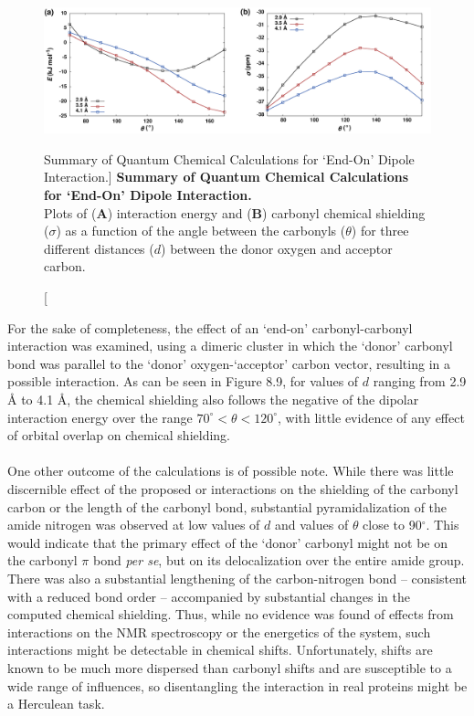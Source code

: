 \begin{figure}[h!]
\includegraphics[width=6.5in]{figs/npistar/09.png}
\caption
   [Summary of Quantum Chemical Calculations for `End-On' Dipole Interaction.]
  {{\bf
    Summary of Quantum Chemical Calculations for `End-On' Dipole Interaction.
  }
  \\
  Plots of ({\bf A}) interaction energy and ({\bf B}) carbonyl \cnmr{} chemical
  shielding ($\sigma$) as a function of the angle between the carbonyls
  ($\theta$) for three different distances ($d$) between the donor oxygen
  and acceptor carbon.
}
\end{figure}

\begin{doublespace}
For the sake of completeness, the effect of an `end-on' carbonyl-carbonyl
interaction was examined, using a dimeric cluster in which the `donor' carbonyl
bond was parallel to the `donor' oxygen-`acceptor' carbon vector, resulting in
a possible \nspistar{} interaction. As can be seen in Figure 8.9, for values of
$d$ ranging from 2.9 \r{A} to 4.1 \r{A}, the chemical shielding also follows
the negative of the dipolar interaction energy over the range
$70^\circ < \theta < 120^\circ$, with little evidence of any effect of orbital
overlap on chemical shielding.
\\\\
One other outcome of the calculations is of possible note. While there was
little discernible effect of the proposed \nspistar{} or \npipistar{}
interactions on the shielding of the carbonyl carbon or the length of the
carbonyl bond, substantial pyramidalization of the amide nitrogen was observed
at low values of $d$ and values of $\theta$ close to 90$^\circ$. This would
indicate that the primary effect of the `donor' carbonyl might not be on the
carbonyl $\pi$ bond \emph{per se}, but on its delocalization over the entire
amide group. There was also a substantial lengthening of the carbon-nitrogen
bond -- consistent with a reduced bond order -- accompanied by substantial
changes in the computed \nnmr{} chemical shielding. Thus, while no evidence
was found of effects from \nspistar{} interactions on the \cnmr{} NMR
spectroscopy or the energetics of the system, such interactions might be
detectable in \nnmr{} chemical shifts. Unfortunately, \nnmr{} shifts are known
to be much more dispersed than carbonyl \cnmr{} shifts and are susceptible to
a wide range of influences, so disentangling the interaction in real proteins
might be a Herculean task.
\end{doublespace}

